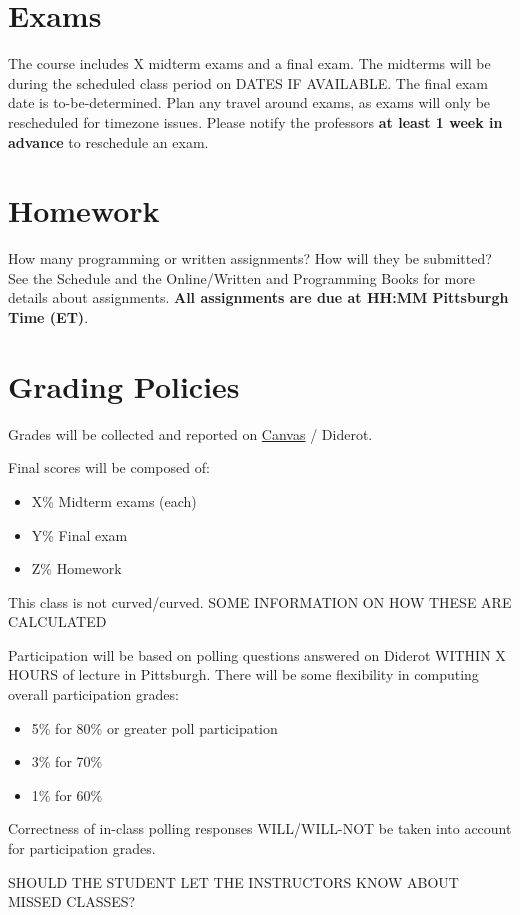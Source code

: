 \section{Exams}


The course includes X midterm exams and a final exam.
%
The midterms will be during the scheduled class period on DATES IF AVAILABLE.
%
The final exam date is to-be-determined. 
%
Plan any travel around exams, as exams will only be rescheduled for timezone issues. 
%
Please notify the professors \textbf{at least 1 week in advance} to reschedule an exam.

\section{Homework}

How many programming or written assignments?
%
How will they be submitted?  
%
See the Schedule and the Online/Written and Programming Books for more details about assignments. 
%
\textbf{All assignments are due at HH:MM Pittsburgh Time (ET)}.

\section{Grading Policies}

\begin{gram}
Grades will be collected and reported on \href{https://canvas.cmu.edu/courses/13339/grades}{Canvas}
/
Diderot.
%

Final scores will be composed of:
\begin{itemize}
\item X\% Midterm exams (each)
\item Y\% Final exam
\item Z\% Homework
\end{itemize}
\end{gram}          

\begin{gram}
This class is not curved/curved. 
%
SOME INFORMATION ON HOW THESE ARE CALCULATED
\end{gram}


\begin{gram}
Participation will be based on polling questions answered on Diderot WITHIN X HOURS of lecture in Pittsburgh. 
%
There will be some flexibility in computing overall participation grades:
          \begin{itemize}
            \item 5\% for 80\% or greater poll participation
            \item 3\% for 70\%
            \item 1\% for 60\%
            \end{itemize}
%
Correctness of in-class polling responses WILL/WILL-NOT be taken into account for participation grades.

SHOULD THE STUDENT LET THE INSTRUCTORS KNOW ABOUT MISSED CLASSES?
\end{gram}

